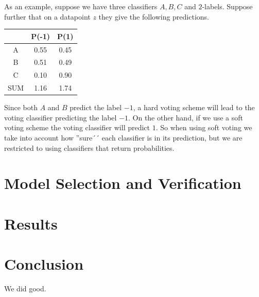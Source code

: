 \documentclass[parskip=half]{scrartcl}
\theoremstyle{definition}
\theoremstyle{remark}
\begin{document}
As an example, suppose we have three classifiers $A,B,C$ and $2$-labels. 
Suppose further that on a datapoint $z$ they give the following predictions.

\begin{center}
\begin{tabular}{c|cc}
 & P(-1) & P(1) \\ 
\hline
\hline 
A & 0.55 & 0.45 \\ 
B & 0.51 & 0.49 \\ 
C & 0.10 & 0.90 \\ 
SUM & 1.16 & 1.74
\end{tabular} 
\end{center}

Since both $A$ and $B$ predict the label $-1$, a hard voting scheme will lead to the voting classifier predicting the label $-1$.
On the other hand, if we use a soft voting scheme the voting classifier will predict $1$.
So when using soft voting  we take into account how ''sure´´ each classifier is in its prediction, but we are restricted to using classifiers that return probabilities.  
\section{Model Selection and Verification}

\section{Results} \label{sec:results}

\section{Conclusion} \label{sec:conclusion}

We did good.


\end{document}
